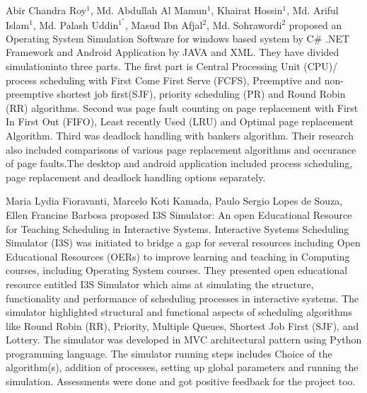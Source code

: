 \begin{onehalfspacing}
\par Abir Chandra Roy$^1$, Md. Abdullah Al Mamun$^1$, Khairat Hossin$^1$, Md. Ariful Islam$^1$, Md. Palash Uddin$^1^*$, Masud Ibn Afjal$^2$, Md. Sohrawordi$^2$ \cite{palash} proposed an Operating System Simulation Software for windows based system by C# .NET Framework and Android Application by JAVA and XML. They have divided simulationinto three parts. The first part is Central Processing Unit (CPU)/ process scheduling with First Come First Serve (FCFS), Preemptive and non-preemptive shortest job first(SJF), priority scheduling (PR) and Round Robin (RR) algorithms. Second was page fault counting on page replacement with First In First Out (FIFO), Least recently Used (LRU) and Optimal page replacement Algorithm. Third was deadlock handling with bankers algorithm. Their research also included comparisons of various page replacement algorithms and occurance of page faults.The desktop and android application included process scheduling, page replacement and deadlock handling options separately.\newline

\par Maria Lydia Fioravanti, Marcelo Koti Kamada, Paulo Sergio Lopes de Souza, Ellen Francine Barbosa \cite{maria} proposed I3S Simulator: An open Educational Resource for Teaching Scheduling in Interactive Systems. Interactive Systems Scheduling Simulator (I3S) was initiated to bridge a gap for several resources including Open Educational Resources (OERs) to improve learning and teaching in Computing courses, including Operating System courses. They presented open educational resource entitled I3S Simulator which aims at simulating the structure, functionality and performance of scheduling processes in interactive systems. The simulator highlighted structural and functional aspects of scheduling algorithms like Round Robin (RR), Priority, Multiple Queues, Shortest Job First (SJF), and Lottery. The simulator was developed in MVC architectural pattern using Python programming language. The simulator running steps includes Choice of the algorithm(s), addition of processes, setting up global parameters and running the simulation. Assessments were done and got positive feedback for the project too.\newline


\end{onehalfspacing}
